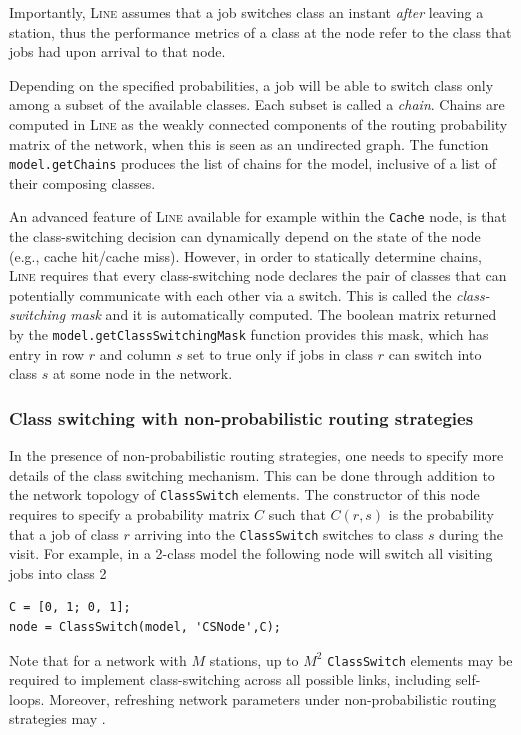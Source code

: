Importantly, \textsc{Line} assumes that a job switches class an instant {\em after} leaving a station, thus the performance metrics of a class at the node refer to the class that jobs had upon arrival to that node.

Depending on the specified probabilities, a job will be able to switch class only among a subset of the available classes. Each subset is called a {\em chain}. Chains are computed in \textsc{Line} as the weakly connected components of the routing probability matrix of the network, when this is seen as an undirected graph. The function \texttt{model.getChains} produces the list of chains for the model, inclusive of a list of their composing classes.

An advanced feature of \textsc{Line} available for example within the \texttt{Cache} node, is that the class-switching decision can dynamically depend on the state of the node (e.g., cache hit/cache miss). However, in order to statically determine chains, \textsc{Line} requires that every class-switching node declares the pair of classes that can potentially communicate with each other via a switch. This is called the {\em class-switching mask} and it is automatically computed. The boolean matrix returned by the \texttt{model.getClassSwitchingMask} function provides this mask, which has entry in row $r$ and column $s$ set to true only if jobs in class $r$ can switch into class $s$ at some node in the network.

\subsubsection{Class switching with non-probabilistic routing strategies}
In the presence of non-probabilistic routing strategies, one needs to specify more details of the class switching mechanism. This can be done through addition to the network topology of \texttt{ClassSwitch} elements. The constructor of this node requires to specify a probability matrix $C$ such that $C(r,s)$ is the probability that a job of class $r$ arriving into the \texttt{ClassSwitch} switches to class $s$ during the visit. For example, in a 2-class model the following node will switch all visiting jobs into class 2
\begin{lstlisting}
C = [0, 1; 0, 1];
node = ClassSwitch(model, 'CSNode',C);
\end{lstlisting}
Note that for a network with $M$ stations, up to $M^2$ \texttt{ClassSwitch} elements may be required to implement class-switching across all possible links, including self-loops. Moreover, refreshing network parameters under non-probabilistic routing strategies may .

